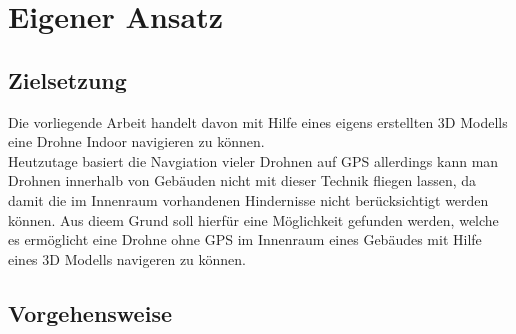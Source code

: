 \chapter{Eigener Ansatz}

\section{Zielsetzung}
Die vorliegende Arbeit handelt davon mit Hilfe eines eigens erstellten 3D Modells eine Drohne Indoor navigieren zu können. \\
Heutzutage basiert die Navgiation vieler Drohnen auf \ac{GPS} allerdings kann man Drohnen innerhalb von Gebäuden nicht mit dieser Technik fliegen lassen, da damit die im Innenraum vorhandenen Hindernisse nicht berücksichtigt werden können. Aus dieem Grund soll hierfür eine Möglichkeit gefunden werden, welche es ermöglicht eine Drohne ohne \ac{GPS} im Innenraum eines Gebäudes mit Hilfe eines 3D Modells navigeren zu können.

\acs{}

\section{Vorgehensweise}

